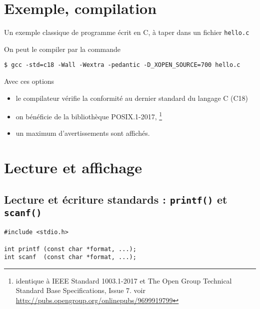 

\section{Exemple, compilation}

Un exemple classique de programme écrit en C,
à taper dans un fichier \texttt{hello.c}

\extrait


On peut le compiler par la commande

\extraitbash
\begin{lstlisting}
$ gcc -std=c18 -Wall -Wextra -pedantic -D_XOPEN_SOURCE=700 hello.c
\end{lstlisting}


Avec ces options

\begin{itemize}
  \item le compilateur vérifie la conformité  au dernier standard
    du langage C (C18)
  \item on  bénéficie de la bibliothèque POSIX.1-2017,
\footnote{
  identique à IEEE Standard 1003.1-2017 et
  The Open Group Technical Standard Base Specifications, Issue 7.
  voir \url{http://pubs.opengroup.org/onlinepubs/9699919799}
}
\item un maximum d'avertissements sont affichés.
\end{itemize}






\section{Lecture et affichage}

\subsection{Lecture et écriture standards : \texttt{printf()} et \texttt{scanf()}}

  
 \extrait
\begin{lstlisting}
#include <stdio.h>
  
int printf (const char *format, ...);     
int scanf  (const char *format, ...); 
\end{lstlisting}



